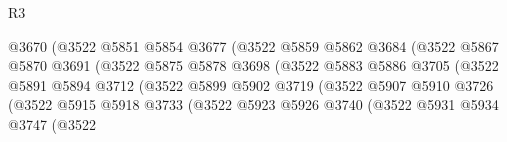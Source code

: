 \begin{lexlean}{R3}
\begin{coremodule}
                                        @3670
                                        (@3522
                                          @5851
                                          @5854
                                          @3677
                                          (@3522
                                            @5859
                                            @5862
                                            @3684
                                            (@3522
                                              @5867
                                              @5870
                                              @3691
                                              (@3522
                                                @5875
                                                @5878
                                                @3698
                                                (@3522
                                                  @5883
                                                  @5886
                                                  @3705
                                                  (@3522
                                                    @5891
                                                    @5894
                                                    @3712
                                                    (@3522
                                                      @5899
                                                      @5902
                                                      @3719
                                                      (@3522
                                                        @5907
                                                        @5910
                                                        @3726
                                                        (@3522
                                                          @5915
                                                          @5918
                                                          @3733
                                                          (@3522
                                                            @5923
                                                            @5926
                                                            @3740
                                                            (@3522
                                                              @5931
                                                              @5934
                                                              @3747
                                                              (@3522

\end{coremodule}
\end{lexlean}
